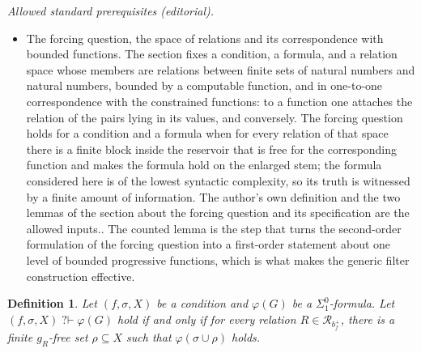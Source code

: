 \documentclass{article}
\newcommand{\uh}{\upharpoonright}
\newcommand{\qvdash}{\operatorname{{?}{\vdash}}}
\newtheorem{lemma}[theorem]{Lemma}
\newtheorem{definition}[theorem]{Definition}
\newcommand{\R}{\mathcal{R}}
\begin{document}
\noindent\textit{Allowed standard prerequisites (editorial).}\begin{itemize}
\item The forcing question, the space of relations and its correspondence with bounded functions. The section fixes a condition, a formula, and a relation space whose members are relations between finite sets of natural numbers and natural numbers, bounded by a computable function, and in one-to-one correspondence with the constrained functions: to a function one attaches the relation of the pairs lying in its values, and conversely. The forcing question holds for a condition and a formula when for every relation of that space there is a finite block inside the reservoir that is free for the corresponding function and makes the formula hold on the enlarged stem; the formula considered here is of the lowest syntactic complexity, so its truth is witnessed by a finite amount of information. The author's own definition and the two lemmas of the section about the forcing question and its specification are the allowed inputs.. The counted lemma is the step that turns the second-order formulation of the forcing question into a first-order statement about one level of bounded progressive functions, which is what makes the generic filter construction effective.
\end{itemize}\medskip
\begin{definition}
Let $(f, \sigma, X)$ be a condition and $\varphi(G)$ be a $\Sigma^0_1$-formula.
Let $(f, \sigma, X) \qvdash \varphi(G)$ hold if and only if for every relation $R \in \R_{b_f^{+}}$, there is a finite $g_R$-free set $\rho \subseteq X$ such that $\varphi(\sigma \cup \rho)$ holds.
\end{definition}

\end{document}
